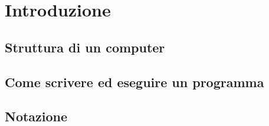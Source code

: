 \chapter{Introduzione}
\section{Struttura di un computer}
\section{Come scrivere ed eseguire un programma}
\section{Notazione}




\newpage